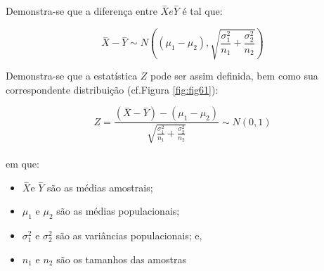 \documentclass[
]{book}
\providecommand{\tightlist}{%
  \setlength{\itemsep}{0pt}\setlength{\parskip}{0pt}}
\begin{document}
\hfill\break

Demonstra-se que a diferença entre \(\stackrel{-}{X} e \stackrel{-}{Y}\) é tal que:

\hfill\break

\[
\stackrel{-}{X} - \stackrel{-}{Y} \sim N((\mu_{1}-\mu_{2}) ,    \sqrt{\frac{\sigma^{2}_{1}}{n_{1}} + \frac{\sigma^{2}_{2}}{n_{2}} }      )  
\]

\hfill\break

Demonstra-se que a estatística \(Z\) pode ser assim definida, bem como sua correspondente distribuição (cf.Figura \ref{fig:fig61}):

\hfill\break

\[
Z = \frac{   (\stackrel{-}{X}-\stackrel{-}{Y})   - (\mu_{1}-\mu_{2})}{ \sqrt{\frac{\sigma^{2}_{1}}{n_{1}} + \frac{\sigma^{2}_{2}}{n_{2}} }      }  \sim N(0 ,1)
\]\\

em que:

\hfill\break

\begin{itemize}
\tightlist
\item
  \(\stackrel{-}{X}\)e \(\stackrel{-}{Y}\) são as médias amostrais;\\
\item
  \(\mu_{1}\) e \(\mu_{2}\) são as médias populacionais;\\
\item
  \(\sigma_{1}^{2}\) e \(\sigma_{2}^{2}\) são as variâncias populacionais; e,
\item
  \(n_{1}\) e \(n_{2}\) são os tamanhos das amostras
\end{itemize}

\hfill\break
\end{document}
